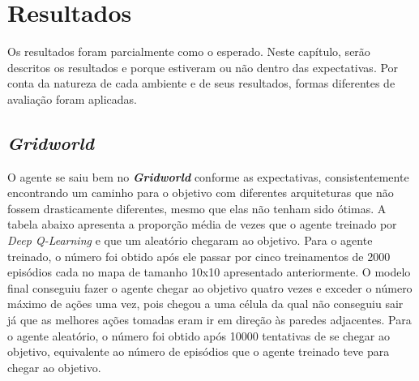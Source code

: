 
\chapter{Resultados}
\label{cap:resultados}

Os resultados foram parcialmente como o esperado.
Neste capítulo, serão descritos os resultados e porque estiveram ou não dentro das expectativas.
Por conta da natureza de cada ambiente e de seus resultados, formas diferentes de avaliação foram aplicadas.

\section{\textit{Gridworld}}
\label{sec:res_gridworld}

O agente se saiu bem no \textbf{\textit{Gridworld}} conforme as expectativas, consistentemente encontrando um caminho para o objetivo com diferentes arquiteturas que não fossem drasticamente diferentes, mesmo que elas não tenham sido ótimas.
A tabela abaixo apresenta a proporção média de vezes que o agente treinado por \textit{Deep Q-Learning} e que um aleatório chegaram ao objetivo.
Para o agente treinado, o número foi obtido após ele passar por cinco treinamentos de 2000 episódios cada no mapa de tamanho 10x10 apresentado anteriormente.
O modelo final conseguiu fazer o agente chegar ao objetivo quatro vezes e exceder o número máximo de ações uma vez, pois chegou a uma célula da qual não conseguiu sair já que as melhores ações tomadas eram ir em direção às paredes adjacentes.
Para o agente aleatório, o número foi obtido após 10000 tentativas de se chegar ao objetivo, equivalente ao número de episódios que o agente treinado teve para chegar ao objetivo.
\\



